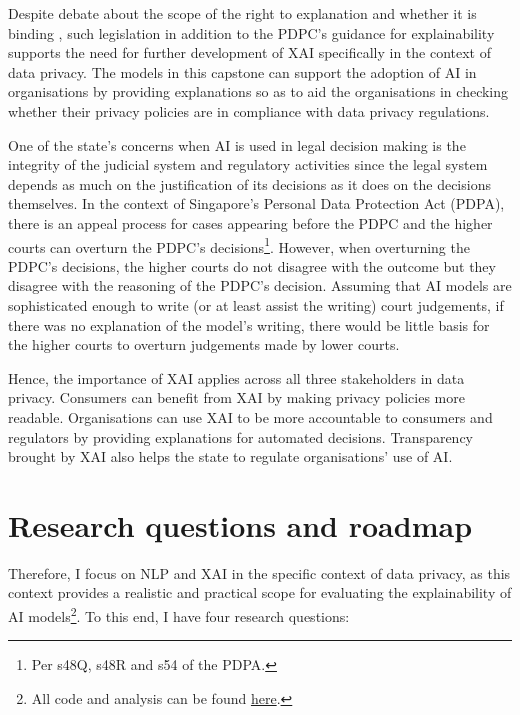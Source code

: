Despite debate about the scope of the right to explanation and whether it is binding \cite{chesterman2021_transparency}, such legislation in addition to the PDPC's guidance for explainability supports the need for further development of XAI specifically in the context of data privacy. The models in this capstone can support the adoption of AI in organisations by providing explanations so as to aid the organisations in checking whether their privacy policies are in compliance with data privacy regulations.

One of the state's concerns when AI is used in legal decision making is the integrity of the judicial system and regulatory activities \cite{chesterman2021_opacity} since the legal system depends as much on the justification of its decisions as it does on the decisions themselves. In the context of Singapore's Personal Data Protection Act (PDPA), there is an appeal process for cases appearing before the PDPC and the higher courts can overturn the PDPC's decisions\footnote{Per s48Q, s48R and s54 of the PDPA.}. However, when overturning the PDPC's decisions, the higher courts do not disagree with the outcome but they disagree with the reasoning of the PDPC's decision. Assuming that AI models are sophisticated enough to write (or at least assist the writing) court judgements, if there was no explanation of the model's writing, there would be little basis for the higher courts to overturn judgements made by lower courts. 

Hence, the importance of XAI applies across all three stakeholders in data privacy. Consumers can benefit from XAI by making privacy policies more readable. Organisations can use XAI to be more accountable to consumers and regulators by providing explanations for automated decisions. Transparency brought by XAI also helps the state to regulate organisations' use of AI.

\section{Research questions and roadmap}
\label{chap1:research_questions}
Therefore, I focus on NLP and XAI in the specific context of data privacy, as this context provides a realistic and practical scope for evaluating the explainability of AI models\footnote{All code and analysis can be found \href{https://github.com/TristanKoh/capstone-repo/}{here}.}. To this end, I have four research questions: 

